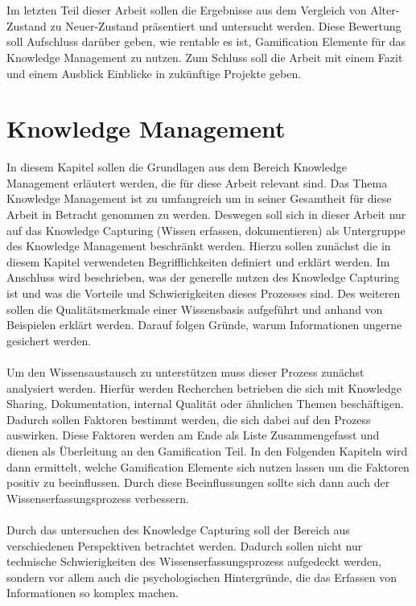 \documentclass[a4paper,12pt,twoside]{scrartcl}
\begin{document}
\\\\
Im letzten Teil dieser Arbeit sollen die Ergebnisse aus dem Vergleich von Alter-Zustand zu Neuer-Zustand präsentiert und untersucht werden. Diese Bewertung soll Aufschluss darüber geben, wie rentable es ist, Gamification Elemente für das Knowledge Management zu nutzen. Zum Schluss soll die Arbeit mit einem Fazit und einem Ausblick Einblicke in zukünftige Projekte geben.
\newpage
\section{Knowledge Management}
In diesem Kapitel sollen die Grundlagen aus dem Bereich Knowledge Management erläutert werden, die für diese Arbeit relevant sind. Das Thema Knowledge Management ist zu umfangreich um in seiner Gesamtheit für diese Arbeit in Betracht genommen zu werden. Deswegen soll sich in dieser Arbeit nur auf das Knowledge Capturing (Wissen erfassen, dokumentieren) als Untergruppe des Knowledge Management beschränkt werden. Hierzu sollen zunächst die in diesem Kapitel verwendeten Begrifflichkeiten definiert und erklärt werden. Im Anschluss wird beschrieben, was der generelle nutzen des Knowledge Capturing ist und was die Vorteile und Schwierigkeiten dieses Prozesses sind. Des weiteren sollen die Qualitätsmerkmale einer Wissensbasis aufgeführt und anhand von Beispielen erklärt werden. Darauf folgen Gründe, warum Informationen ungerne gesichert werden.
\\\\
Um den Wissensaustausch zu unterstützen muss dieser Prozess zunächst analysiert werden. Hierfür werden Recherchen betrieben die sich mit Knowledge Sharing, Dokumentation, internal Qualität oder ähnlichen Themen beschäftigen. Dadurch sollen Faktoren bestimmt werden, die sich dabei auf den Prozess auswirken. Diese Faktoren werden am Ende als Liste Zusammengefasst und dienen als Überleitung an den Gamification Teil. In den Folgenden Kapiteln wird dann ermittelt, welche Gamification Elemente sich nutzen lassen um die Faktoren positiv zu beeinflussen. Durch diese Beeinflussungen sollte sich dann auch der Wissenserfassungsprozess verbessern.
\\\\
Durch das untersuchen des Knowledge Capturing soll der Bereich aus verschiedenen Perspektiven betrachtet werden. Dadurch sollen nicht nur technische Schwierigkeiten des Wissenserfassungsprozess aufgedeckt werden, sondern vor allem auch die psychologischen Hintergründe, die das Erfassen von Informationen so komplex machen.
\end{document}
